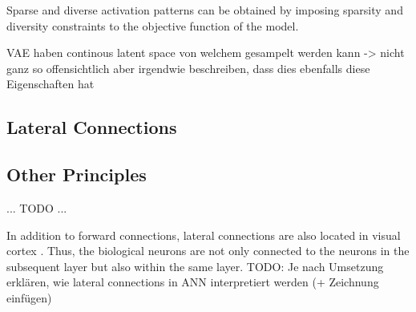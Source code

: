 \begin{implementation}
	Sparse and diverse activation patterns can be obtained by imposing sparsity and diversity constraints to the objective function of the model.
\end{implementation}

VAE haben continous latent space von welchem gesampelt werden kann -> nicht ganz so offensichtlich aber irgendwie beschreiben, dass dies ebenfalls diese Eigenschaften hat

 

\subsection{Lateral Connections}


\subsection{Other Principles}









... TODO ...










In addition to forward connections, lateral connections are also located in visual cortex .
Thus, the biological neurons are not only connected to the neurons in the subsequent layer but also within the same layer.
TODO: Je nach Umsetzung erklären, wie lateral connections in ANN interpretiert werden (+ Zeichnung einfügen)

